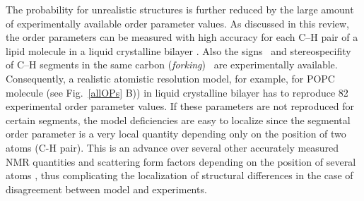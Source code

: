 \documentclass[aps,prl,superscriptaddress,twocolumn]{revtex4}
\begin{document}
The probability for unrealistic structures is further reduced by the large amount of experimentally 
available order parameter values. As discussed in this review, the order parameters can be measured
with high accuracy for each C--H pair of a lipid molecule in a liquid crystalline 
bilayer \cite{seelig77c,jacobs81,davis83,gross97,dvinskikh05a,ferreira13,botan15}.
Also the signs~\cite{hong95a,hong95b,gross97} and stereospecifity of C--H segments 
in the same carbon ({\it forking})~\cite{seelig75,gally81,engel81,gross97,dvinskikh05a,ferreira13}
are experimentally available. Consequently, a realistic atomistic resolution model,
for example, for POPC molecule (see Fig.~\ref{allOPs} B)) in liquid crystalline bilayer has to reproduce 82 experimental order parameter values.
If these parameters are not reproduced for certain segments, the model deficiencies are easy to localize
since the segmental order parameter is a very local quantity depending only on the position of two atoms (C-H pair).
This is an advance over several other accurately measured NMR quantities and scattering form factors  
depending on the position of several atoms \cite{prakash10,chowdhary13,kucerka10}, thus complicating the localization of structural differences 
in the case of disagreement between model and experiments.
\end{document}
